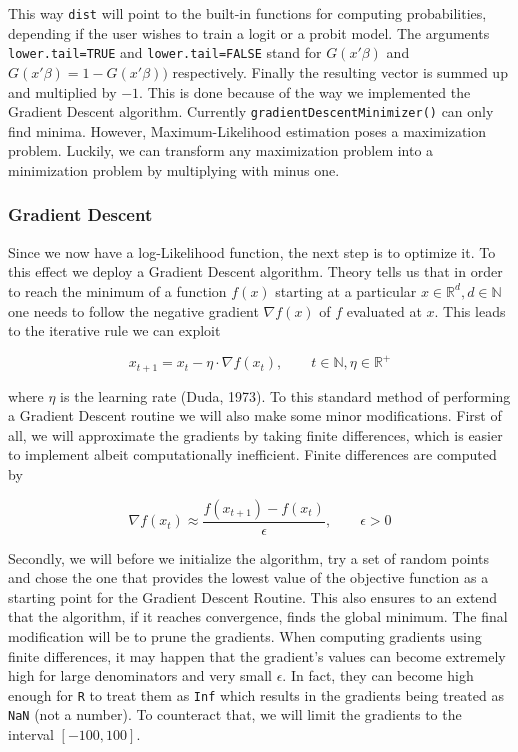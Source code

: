 \documentclass{article}
\begin{document}
This way \texttt{dist} will point to the built-in functions for computing probabilities, depending if the user wishes to train a logit or a probit model. The arguments \texttt{lower.tail=TRUE} and \texttt{lower.tail=FALSE} stand for $G(x\prime \beta)$ and $G(x\prime \beta)= 1 - G(x\prime \beta))$ respectively. Finally the resulting vector is summed up and multiplied by $-1$. This is done because of the way we implemented the Gradient Descent algorithm. Currently \texttt{gradientDescentMinimizer()} can only find minima. However, Maximum-Likelihood estimation poses a maximization problem. Luckily, we can transform any maximization problem into a minimization problem by multiplying with minus one.

\subsubsection{Gradient Descent}

Since we now have a log-Likelihood function, the next step is to optimize it. To this effect we deploy a Gradient Descent algorithm. Theory tells us that in order to reach the minimum of a function $f(x)$ starting at a particular $x \in \mathbb{R}^d, d \in \mathbb{N}$ one needs to follow the negative gradient $\nabla f(x)$ of $f$ evaluated at $x$. This leads to the iterative rule we can exploit

\begin{equation}
\label{gradientDescent}
x_{t+1} = x_t - \eta \cdot \nabla f(x_t), \qquad t \in \mathbb{N}, \eta \in \mathbb{R}^+
\end{equation}

where $\eta$ is the learning rate (Duda, 1973). To this standard method of performing a Gradient Descent routine we will also make some minor modifications. First of all, we will approximate the gradients by taking finite differences, which is easier to implement albeit computationally inefficient. Finite differences are computed by

\begin{equation}
\label{finDiff}
\nabla f(x_t) \approx \frac{f(x_{t+1}) - f(x_t)}{\epsilon}, \qquad \epsilon > 0
\end{equation}

Secondly, we will before we initialize the algorithm, try a set of random points and chose the one that provides the lowest value of the objective function as a starting point for the Gradient Descent Routine. This also ensures to an extend that the algorithm, if it reaches convergence, finds the global minimum. The final modification will be to prune the gradients. When computing gradients using finite differences, it may happen that the gradient's values can become extremely high for large denominators and very small $\epsilon$. In fact, they can become high enough for \texttt{R} to treat them as \texttt{Inf} which results in the gradients being treated as \texttt{NaN} (not a number). To counteract that, we will limit the gradients to the interval $[-100, 100]$. 
\end{document}
